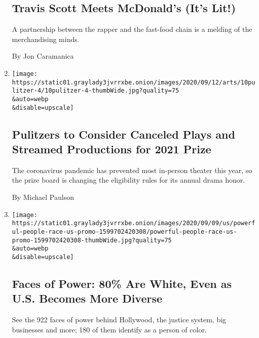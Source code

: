 \begin{enumerate}
  \hypertarget{travis-scott-meets-mcdonalds-its-lit}{%
  \subsection{Travis Scott Meets McDonald's (It's
  Lit!)}\label{travis-scott-meets-mcdonalds-its-lit}}

  A partnership between the rapper and the fast-food chain is a melding
  of the merchandising minds.

  By Jon Caramanica
\item
  \href{/2020/09/10/theater/pulitzer-prize-drama-coronavirus.html}{}

  \texttt{[image: https://static01.graylady3jvrrxbe.onion/images/2020/09/12/arts/10pulitzer-4/10pulitzer-4-thumbWide.jpg?quality=75\\\&auto=webp\\\&disable=upscale]}

  \hypertarget{pulitzers-to-consider-canceled-plays-and-streamed-productions-for-2021-prize}{%
  \subsection{Pulitzers to Consider Canceled Plays and Streamed
  Productions for 2021
  Prize}\label{pulitzers-to-consider-canceled-plays-and-streamed-productions-for-2021-prize}}

  The coronavirus pandemic has prevented most in-person theater this
  year, so the prize board is changing the eligibility rules for its
  annual drama honor.

  By Michael Paulson
\item
  \href{/interactive/2020/09/09/us/powerful-people-race-us.html}{}

  \texttt{[image: https://static01.graylady3jvrrxbe.onion/images/2020/09/09/us/powerful-people-race-us-promo-1599702420308/powerful-people-race-us-promo-1599702420308-thumbWide.jpg?quality=75\\\&auto=webp\\\&disable=upscale]}

  \hypertarget{faces-of-power-80-are-white-even-as-us-becomes-more-diverse}{%
  \subsection{Faces of Power: 80\% Are White, Even as U.S. Becomes More
  Diverse}\label{faces-of-power-80-are-white-even-as-us-becomes-more-diverse}}

  See the 922 faces of power behind Hollywood, the justice system, big
  businesses and more; 180 of them identify as a person of color.


\end{enumerate}

